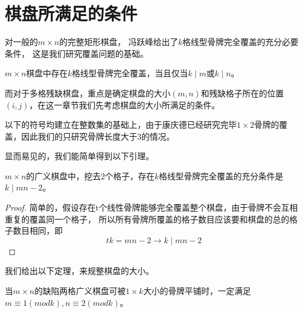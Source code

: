 \chapter{棋盘所满足的条件}

对一般的$m \times n$的完整矩形棋盘， 冯跃峰\cite{fengBasicTheorem}给出了$k$格线型骨牌完全覆盖的充分必要条件， 这是我们研究覆盖问题的基础。

\begin{lemma}
    \label{basic-lemma-1}
    $m \times n$棋盘中存在$k$格线型骨牌完全覆盖，当且仅当$k \mid m$或$k \mid n$。
\end{lemma}

而对于多格残缺棋盘，重点是确定棋盘的大小$(m, n)$和残缺格子所在的位置$(i, j)$，在这一章节我们先考虑棋盘的大小所满足的条件。

以下的符号均建立在整数集的基础上，由于康庆德已经研究完毕$1 \times 2$骨牌的覆盖\cite{ZRZZ199205013}，因此我们的只研究骨牌长度大于3的情况。

显而易见的，我们能简单得到以下引理。
\begin{lemma}
    \label{basic-lemma-2}
    $m \times n$的广义棋盘中，挖去2个格子，存在$k$格线型骨牌完全覆盖的充分条件是$k \mid mn - 2$。
\end{lemma}
\begin{proof}
    简单的，假设存在t个线性骨牌能够完全覆盖整个棋盘，由于骨牌不会互相重复的覆盖同一个格子，
    所以所有骨牌所覆盖的格子数目应该要和棋盘的总的格子数目相同，即
    \begin{equation}
        tk = mn - 2 \rightarrow k \mid mn - 2
    \end{equation}
\end{proof}
我们给出以下定理，来规整棋盘的大小。
\begin{theorem}
    \label{basic-theorem-1}
    当$m \times n$的缺陷两格广义棋盘可被$1 \times k$大小的骨牌平铺时，一定满足$m \equiv 1 (mod k), n \equiv 2 (mod k)$。
\end{theorem}

